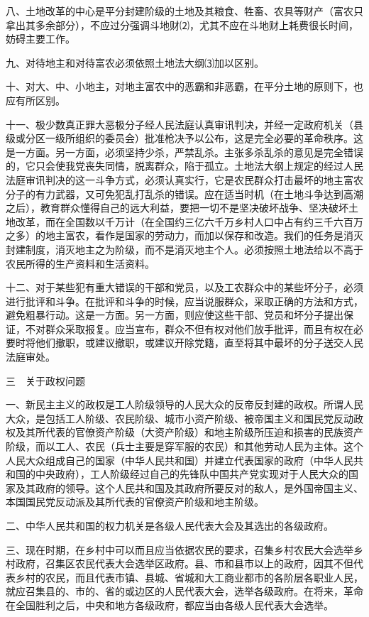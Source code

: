 \documentclass[UTF-8, a5paper, 12pt]{ctexart}
\begin{document}
八、土地改革的中心是平分封建阶级的土地及其粮食、牲畜、农具等财产（富农只拿出其多余部分），不应过分强调斗地财⑵，尤其不应在斗地财上耗费很长时间，妨碍主要工作。

九、对待地主和对待富农必须依照土地法大纲⑶加以区别。

十、对大、中、小地主，对地主富农中的恶霸和非恶霸，在平分土地的原则下，也应有所区别。

十一、极少数真正罪大恶极分子经人民法庭认真审讯判决，并经一定政府机关（县级或分区一级所组织的委员会）批准枪决予以公布，这是完全必要的革命秩序。这是一方面。另一方面，必须坚持少杀，严禁乱杀。主张多杀乱杀的意见是完全错误的，它只会使我党丧失同情，脱离群众，陷于孤立。土地法大纲上规定的经过人民法庭审讯判决的这一斗争方式，必须认真实行，它是农民群众打击最坏的地主富农分子的有力武器，又可免犯乱打乱杀的错误。应在适当时机（在土地斗争达到高潮之后），教育群众懂得自己的远大利益，要把一切不是坚决破坏战争、坚决破坏土地改革，而在全国数以千万计（在全国约三亿六千万乡村人口中占有约三千六百万之多）的地主富农，看作是国家的劳动力，而加以保存和改造。我们的任务是消灭封建制度，消灭地主之为阶级，而不是消灭地主个人。必须按照土地法给以不高于农民所得的生产资料和生活资料。

十二、对于某些犯有重大错误的干部和党员，以及工农群众中的某些坏分子，必须进行批评和斗争。在批评和斗争的时候，应当说服群众，采取正确的方法和方式，避免粗暴行动。这是一方面。另一方面，则应使这些干部、党员和坏分子提出保证，不对群众采取报复。应当宣布，群众不但有权对他们放手批评，而且有权在必要时将他们撤职，或建议撤职，或建议开除党籍，直至将其中最坏的分子送交人民法庭审处。

三　关于政权问题

一、新民主主义的政权是工人阶级领导的人民大众的反帝反封建的政权。所谓人民大众，是包括工人阶级、农民阶级、城市小资产阶级、被帝国主义和国民党反动政权及其所代表的官僚资产阶级（大资产阶级）和地主阶级所压迫和损害的民族资产阶级，而以工人、农民（兵士主要是穿军服的农民）和其他劳动人民为主体。这个人民大众组成自己的国家（中华人民共和国）并建立代表国家的政府（中华人民共和国的中央政府），工人阶级经过自己的先锋队中国共产党实现对于人民大众的国家及其政府的领导。这个人民共和国及其政府所要反对的敌人，是外国帝国主义、本国国民党反动派及其所代表的官僚资产阶级和地主阶级。

二、中华人民共和国的权力机关是各级人民代表大会及其选出的各级政府。

三、现在时期，在乡村中可以而且应当依据农民的要求，召集乡村农民大会选举乡村政府，召集区农民代表大会选举区政府。县、市和县市以上的政府，因其不但代表乡村的农民，而且代表市镇、县城、省城和大工商业都市的各阶层各职业人民，就应召集县的、市的、省的或边区的人民代表大会，选举各级政府。在将来，革命在全国胜利之后，中央和地方各级政府，都应当由各级人民代表大会选举。
\end{document}
